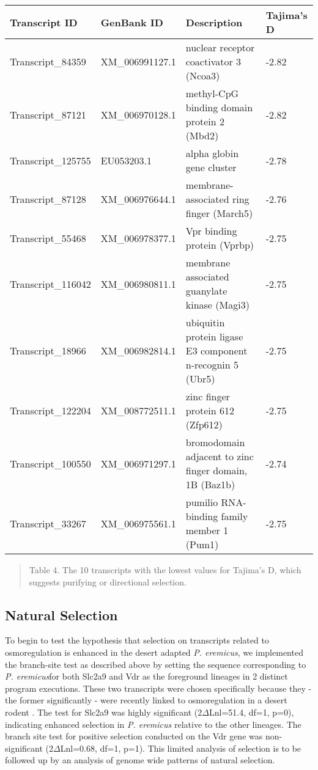 \documentclass[11pt]{article}
\newcommand{\peer}{\textit{P. eremicus}}
\begin{document}
\begin{center}
\begin{adjustwidth}{-.75in}{-.75in}%
\begin{tabular}{ l l l l }
\textbf{Transcript ID} & \textbf{GenBank ID} & \textbf{Description} & \textbf{Tajima's D} \\
\hline
Transcript\_84359 & XM\_006991127.1 & nuclear receptor coactivator 3 (Ncoa3) & -2.82\\
Transcript\_87121 & XM\_006970128.1 & methyl-CpG binding domain protein 2 (Mbd2) & -2.82 \\
Transcript\_125755 & EU053203.1 & alpha globin gene cluster & -2.78\\
Transcript\_87128 & XM\_006976644.1 & membrane-associated ring finger (March5) & -2.76 \\
Transcript\_55468 & XM\_006978377.1 & Vpr binding protein (Vprbp) & -2.75\\
Transcript\_116042 & XM\_006980811.1 & membrane associated guanylate kinase (Magi3) & -2.75  \\
Transcript\_18966 & XM\_006982814.1 & ubiquitin protein ligase E3 component n-recognin 5 (Ubr5) & -2.75 \\
Transcript\_122204 & XM\_008772511.1 & zinc finger protein 612 (Zfp612) & -2.75 \\
Transcript\_100550 & XM\_006971297.1 & bromodomain adjacent to zinc finger domain, 1B (Baz1b) & -2.74\\
Transcript\_33267 & XM\_006975561.1 & pumilio RNA-binding family member 1 (Pum1) & -2.75\\
 \end{tabular}
\begin{quote}
\small{Table 4. The 10 transcripts with the lowest values for Tajima's D, which suggests purifying or directional selection.}
\end{quote}  
\end{adjustwidth}
\end{center}

\subsection*{Natural Selection}

To begin to test the hypothesis that selection on transcripts related to osmoregulation is enhanced in the desert adapted \peer, we implemented the branch-site test as described above by setting the sequence corresponding to \peer\:for both Slc2a9 and Vdr as the foreground lineages in 2 distinct program executions. These two transcripts were chosen specifically because they - the former significantly - were recently linked to osmoregulation in a desert rodent \cite{Marra:2014de}. The test for Slc2a9 was highly significant (2$\Delta$Lnl=51.4, df=1, p=0), indicating enhanced selection in \peer\: relative to the other lineages. The branch site test for positive selection conducted on the Vdr gene was non-significant (2$\Delta$Lnl=0.68, df=1, p=1). This limited analysis of selection is to be followed up by an analysis of genome wide patterns of natural selection. \\
\end{document}
